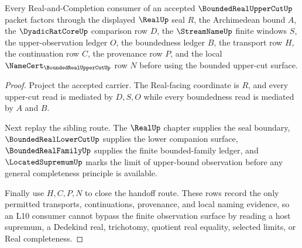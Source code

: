
\begin{theorem}
\label{thm:bounded-real-upper-cut-l10-handoff}
Every Real-and-Completion consumer of an accepted $\BoundedRealUpperCutUp$ packet factors through the displayed $\RealUp$ seal $R$, the Archimedean bound $A$, the $\DyadicRatCoreUp$ comparison row $D$, the $\StreamNameUp$ finite windows $S$, the upper-observation ledger $O$, the boundedness ledger $B$, the transport row $H$, the continuation row $C$, the provenance row $P$, and the local $\NameCert_{\BoundedRealUpperCutUp}$ row $N$ before using the bounded upper-cut surface.
\end{theorem}
\begin{proof}
Project the accepted carrier. The Real-facing coordinate is $R$, and every upper-cut read is mediated by $D,S,O$ while every boundedness read is mediated by $A$ and $B$.

Next replay the sibling route. The $\RealUp$ chapter supplies the seal boundary, $\BoundedRealLowerCutUp$ supplies the lower companion surface, $\BoundedRealFamilyUp$ supplies the finite bounded-family ledger, and $\LocatedSupremumUp$ marks the limit of upper-bound observation before any general completeness principle is available.

Finally use $H,C,P,N$ to close the handoff route. These rows record the only permitted transports, continuations, provenance, and local naming evidence, so an L10 consumer cannot bypass the finite observation surface by reading a host supremum, a Dedekind real, trichotomy, quotient real equality, selected limits, or Real completeness.
\end{proof}

\begin{closurestatus}{\BoundedRealUpperCutUp}
  \theoryclosure{\seedClosure}
  \formalstatus{\unformalizedV}
\end{closurestatus}
